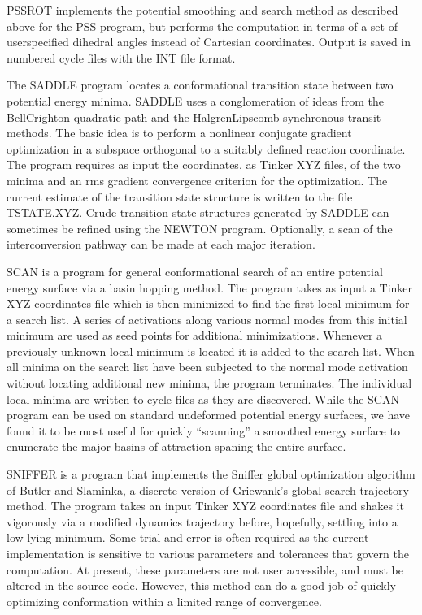 \documentclass[letterpaper,11pt,english]{sphinxmanual}
\begin{document}

PSSROT implements the potential smoothing and search method as described above for the PSS program, but performs the computation in terms of a set of user\sphinxhyphen{}specified dihedral angles instead of Cartesian coordinates. Output is saved in numbered cycle files with the INT file format.


The SADDLE program locates a conformational transition state between two potential energy minima. SADDLE uses a conglomeration of ideas from the Bell\sphinxhyphen{}Crighton quadratic path and the Halgren\sphinxhyphen{}Lipscomb synchronous transit methods. The basic idea is to perform a nonlinear conjugate gradient optimization in a subspace orthogonal to a suitably defined reaction coordinate. The program requires as input the coordinates, as Tinker XYZ files, of the two minima and an rms gradient convergence criterion for the optimization. The current estimate of the transition state structure is written to the file TSTATE.XYZ. Crude transition state structures generated by SADDLE can sometimes be refined using the NEWTON program. Optionally, a scan of the interconversion pathway can be made at each major iteration.


SCAN is a program for general conformational search of an entire potential energy surface via a basin hopping method. The program takes as input a Tinker XYZ coordinates file which is then minimized to find the first local minimum for a search list. A series of activations along various normal modes from this initial minimum are used as seed points for additional minimizations. Whenever a previously unknown local minimum is located it is added to the search list. When all minima on the search list have been subjected to the normal mode activation without locating additional new minima, the program terminates. The individual local minima are written to cycle files as they are discovered. While the SCAN program can be used on standard undeformed potential energy surfaces, we have found it to be most useful for quickly “scanning” a smoothed energy surface to enumerate the major basins of attraction spaning the entire surface.


SNIFFER is a program that implements the Sniffer global optimization algorithm of Butler and Slaminka, a discrete version of Griewank’s global search trajectory method. The program takes an input Tinker XYZ coordinates file and shakes it vigorously via a modified dynamics trajectory before, hopefully, settling into a low lying minimum. Some trial and error is often required as the current implementation is sensitive to various parameters and tolerances that govern the computation. At present, these parameters are not user accessible, and must be altered in the source code. However, this method can do a good job of quickly optimizing conformation within a limited range of convergence.
\end{document}
